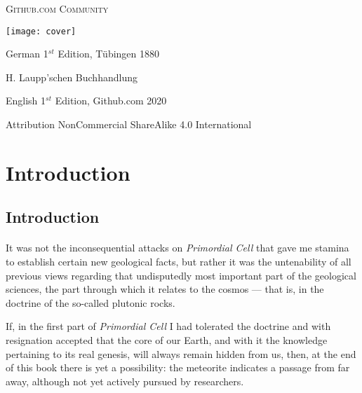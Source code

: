 \documentclass[a4paper, 12pt, oneside]{article}
\begin{document}
\begin{titlepage}
	{\scshape Github.com Community \\ } %
			
	\vspace{1\baselineskip} %
	
	
	\texttt{[image: cover]}
	
		
	\vspace{1\baselineskip} %
	
	German 1$^{st}$ Edition, Tübingen 1880 %
	
	{\small H. Laupp'schen Buchhandlung } %

	\vspace{1\baselineskip} %

    English 1$^{st}$ Edition, Github.com 2020 %
	
	{\small Attribution NonCommercial ShareAlike 4.0 International } %
\end{titlepage}
\setlength{\parskip}{1mm plus1mm minus1mm}
\setcounter{tocdepth}{3}
\setcounter{secnumdepth}{3}
\tableofcontents
\clearpage
\section{Introduction}
\subsection{Introduction}
\paragraph{}
It was not the inconsequential attacks on \emph{Primordial Cell} that gave me stamina to establish certain new geological facts, but rather it was the untenability of all previous views regarding that undisputedly most important part of the geological sciences, the part through which it relates to the cosmos — that is, in the doctrine of the so-called plutonic rocks.

If, in the first part of \emph{Primordial Cell} I had tolerated the doctrine and with resignation accepted that the core of our Earth, and with it the knowledge pertaining to its real genesis, will always remain hidden from us, then, at the end of this book there is yet a possibility: the meteorite indicates a passage from far away, although not yet actively pursued by researchers.
\end{document}
